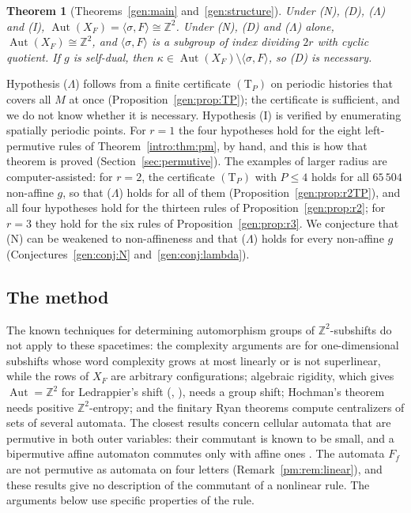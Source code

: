 \documentclass[11pt]{amsart}
\newtheorem{theorem}{Theorem}[section]
\theoremstyle{definition}
\theoremstyle{remark}
\newcommand{\Z}{\mathbb{Z}}
\newcommand{\Aut}{\operatorname{Aut}}
\newcommand{\sh}{\sigma}
\begin{document}
\begin{theorem}[Theorems~\ref{gen:main} and~\ref{gen:structure}]\label{intro:thm:gen}
Under \textup{(N)}, \textup{(D)}, \textup{($\Lambda$)} and \textup{(I)}, $\Aut(X_F)=\langle\sh,F\rangle\cong\Z^2$. Under \textup{(N)}, \textup{(D)} and \textup{($\Lambda$)} alone, $\Aut(X_F)\cong\Z^2$, and $\langle\sh,F\rangle$ is a subgroup of index dividing $2r$ with cyclic quotient. If $g$ is self-dual, then $\kappa\in\Aut(X_F)\setminus\langle\sh,F\rangle$, so \textup{(D)} is necessary.
\end{theorem}

Hypothesis ($\Lambda$) follows from a finite certificate $(\mathrm T_P)$ on periodic histories that covers all $M$ at once (Proposition~\ref{gen:prop:TP}); the certificate is sufficient, and we do not know whether it is necessary. Hypothesis (I) is verified by enumerating spatially periodic points. For $r=1$ the four hypotheses hold for the eight left-permutive rules of Theorem~\ref{intro:thm:pm}, by hand, and this is how that theorem is proved (Section~\ref{sec:permutive}). The examples of larger radius are computer-assisted: for $r=2$, the certificate $(\mathrm T_P)$ with $P\le4$ holds for all $65\,504$ non-affine $g$, so that ($\Lambda$) holds for all of them (Proposition~\ref{gen:prop:r2TP}), and all four hypotheses hold for the thirteen rules of Proposition~\ref{gen:prop:r2}; for $r=3$ they hold for the six rules of Proposition~\ref{gen:prop:r3}. We conjecture that (N) can be weakened to non-affineness and that ($\Lambda$) holds for every non-affine $g$ (Conjectures~\ref{gen:conj:N} and~\ref{gen:conj:lambda}).

\subsection*{The method}
The known techniques for determining automorphism groups of $\Z^2$-subshifts do not apply to these spacetimes: the complexity arguments \cite{CK2015,DDMP2016} are for one-dimensional subshifts whose word complexity grows at most linearly or is not superlinear, while the rows of $X_F$ are arbitrary configurations; algebraic rigidity, which gives $\Aut=\Z^2$ for Ledrappier's shift \cite{Ledrappier1978} (\cite{Ward1994}, \cite[Theorem~7]{BRY2018}), needs a group shift; Hochman's theorem \cite{Hochman2010} needs positive $\Z^2$-entropy; and the finitary Ryan theorems \cite{Salo2019Ryan,Kopra2022} compute centralizers of sets of several automata. The closest results concern cellular automata that are permutive in both outer variables: their commutant is known to be small, and a bipermutive affine automaton commutes only with affine ones \cite{MooreBoykett1997,SaloTorma2013}. The automata $F_f$ are not permutive as automata on four letters (Remark~\ref{pm:rem:linear}), and these results give no description of the commutant of a nonlinear rule. The arguments below use specific properties of the rule.
\end{document}
